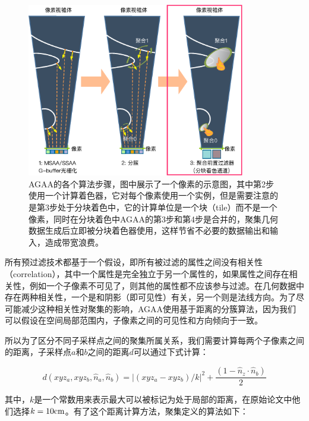 \begin{figure}
\begin{center}
	\includegraphics[width=0.85\textwidth]{figures/shade/agaa-1}
\end{center}
	\caption{AGAA的各个算法步骤，图中展示了一个像素的示意图，其中第2步使用一个计算着色器，它对每个像素使用一个实例，但是需要注意的是第3步处于分块着色中，它的计算单位是一个块（tile）而不是一个像素，同时在分块着色中AGAA的第3步和第4步是合并的，聚集几何数据生成后立即被分块着色器使用，这样节省不必要的数据输出和输入，造成带宽浪费。}
	\label{f:shade-agss-1}
\end{figure}

所有预过滤技术都基于一个假设，即所有被过滤的属性之间没有相关性（correlation），其中一个属性是完全独立于另一个属性的，如果属性之间存在相关性，例如一个子像素不可见了，则其他的属性都不应该参与过滤。在几何数据中存在两种相关性，一个是和阴影（即可见性）有关，另一个则是法线方向。为了尽可能减少这种相关性对聚集的影响，AGAA使用基于距离的分簇算法，因为我们可以假设在空间局部范围内，子像素之间的可见性和方向倾向于一致。

所以为了区分不同子采样点之间的聚集所属关系，我们需要计算每两个子像素之间的距离，子采样点$a$和$b$之间的距离$d$可以通过下式计算：

\begin{equation}
	d(xyz_a,xyz_b,\hat{n}_a,\hat{n}_b)=|(xyz_a-xyz_b)/k|^{2}+\frac{(1-\hat{n}_z\cdot\hat{n}_b)}{2}
\end{equation}

其中，$k$是一个常数用来表示最大可以被标记为处于局部的距离，在原始论文中他们选择$k=10{\rm cm}$。有了这个距离计算方法，聚集定义的算法如下：

